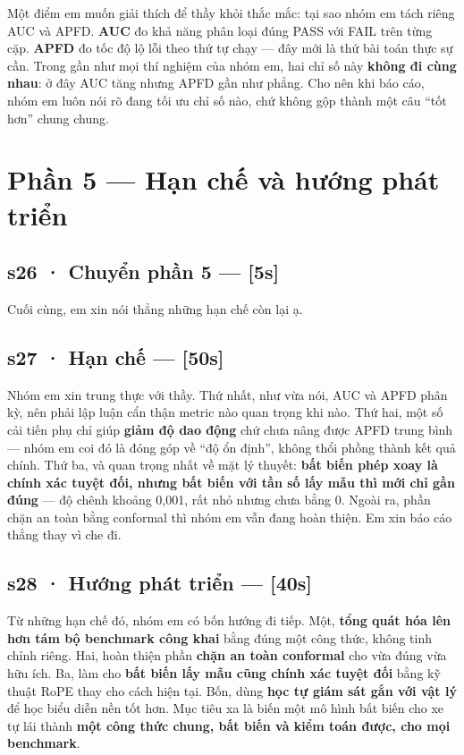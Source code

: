 \documentclass[
  11pt,
]{article}
\begin{document}
Một điểm em muốn giải thích để thầy khỏi thắc mắc: tại sao nhóm em tách
riêng AUC và APFD. \textbf{AUC} đo khả năng phân loại đúng PASS với FAIL
trên từng cặp. \textbf{APFD} đo tốc độ lộ lỗi theo thứ tự chạy --- đây
mới là thứ bài toán thực sự cần. Trong gần như mọi thí nghiệm của nhóm
em, hai chỉ số này \textbf{không đi cùng nhau}: ở đây AUC tăng nhưng
APFD gần như phẳng. Cho nên khi báo cáo, nhóm em luôn nói rõ đang tối ưu
chỉ số nào, chứ không gộp thành một câu ``tốt hơn'' chung chung.

\section{Phần 5 --- Hạn chế và hướng phát
triển}\label{phux1ea7n-5-hux1ea1n-chux1ebf-vuxe0-hux1b0ux1edbng-phuxe1t-triux1ec3n}

\subsection{s26 · Chuyển phần 5 ---
{[}5s{]}}\label{s26-chuyux1ec3n-phux1ea7n-5-5s}

Cuối cùng, em xin nói thẳng những hạn chế còn lại ạ.

\subsection{s27 · Hạn chế ---
{[}50s{]}}\label{s27-hux1ea1n-chux1ebf-50s}

Nhóm em xin trung thực với thầy. Thứ nhất, như vừa nói, AUC và APFD phân
kỳ, nên phải lập luận cẩn thận metric nào quan trọng khi nào. Thứ hai,
một số cải tiến phụ chỉ giúp \textbf{giảm độ dao động} chứ chưa nâng
được APFD trung bình --- nhóm em coi đó là đóng góp về ``độ ổn định'',
không thổi phồng thành kết quả chính. Thứ ba, và quan trọng nhất về mặt
lý thuyết: \textbf{bất biến phép xoay là chính xác tuyệt đối, nhưng bất
biến với tần số lấy mẫu thì mới chỉ gần đúng} --- độ chênh khoảng 0,001,
rất nhỏ nhưng chưa bằng 0. Ngoài ra, phần chặn an toàn bằng conformal
thì nhóm em vẫn đang hoàn thiện. Em xin báo cáo thẳng thay vì che đi.

\subsection{s28 · Hướng phát triển ---
{[}40s{]}}\label{s28-hux1b0ux1edbng-phuxe1t-triux1ec3n-40s}

Từ những hạn chế đó, nhóm em có bốn hướng đi tiếp. Một, \textbf{tổng
quát hóa lên hơn tám bộ benchmark công khai} bằng đúng một công thức,
không tinh chỉnh riêng. Hai, hoàn thiện phần \textbf{chặn an toàn
conformal} cho vừa đúng vừa hữu ích. Ba, làm cho \textbf{bất biến lấy
mẫu cũng chính xác tuyệt đối} bằng kỹ thuật RoPE thay cho cách hiện tại.
Bốn, dùng \textbf{học tự giám sát gắn với vật lý} để học biểu diễn nền
tốt hơn. Mục tiêu xa là biến một mô hình bất biến cho xe tự lái thành
\textbf{một công thức chung, bất biến và kiểm toán được, cho mọi
benchmark}.
\end{document}
